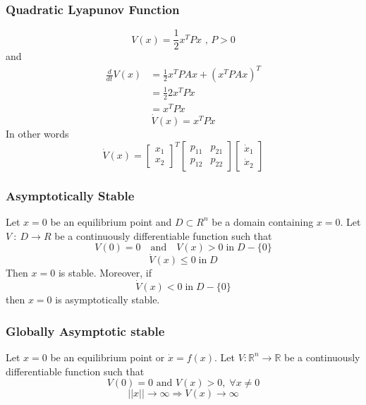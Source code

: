 \documentclass{article}
\begin{document}
\subsubsection{Quadratic Lyapunov Function}
\begin{equation}
	V(x) = \frac{1}{2}x^T Px \textrm{ , } P > 0
\end{equation}
and
\begin{equation}
	\begin{split}
		\frac{d}{dt}V(x) & = \frac{1}{2} x^T P Ax + (x^T PAx)^T \\
		                 & = \frac{1}{2} 2 x^T P\dot x          \\
		                 & = x^T P\dot x
	\end{split}
\end{equation}
\begin{equation}
	\dot V(x) = x^T P\dot x
\end{equation}
In other words
\begin{equation}
	\dot V(x) =
	\begin{bmatrix}
		x_1 \\
		x_2
	\end{bmatrix}^T
	\begin{bmatrix}
		p_{11} & p_{21} \\
		p_{12} & p_{22}
	\end{bmatrix}
	\begin{bmatrix}
		\dot x_1 \\
		\dot x_2
	\end{bmatrix}
\end{equation}
\subsubsection{Asymptotically Stable}
Let $x = 0$ be an equilibrium point and $D \subset R^n$ be a domain containing
$x = 0$. Let $V\::\:D \rightarrow R$ be a continuously differentiable function
such that
\begin{equation}
	V(0) = 0 \quad \textrm{and} \quad V(x) > 0 \; \textrm{in} \; D - \{0\}
\end{equation}
\begin{equation}
	\dot{V}(x) \leq 0 \; \textrm{in} \; D
\end{equation}
Then $x=0$ is stable. Moreover, if
\begin{equation}
	\dot{V}(x) < 0 \; \textrm{in} \; D - \{0\}
\end{equation}
then $x=0$ is asymptotically stable.
\subsubsection{Globally Asymptotic stable}
Let $x=0$ be an equilibrium point or $\dot x = f(x)$. Let $V : \mathbb{R}^n
	\rightarrow \mathbb{R}$ be a continuously differentiable function such that
\begin{equation*}
	V(0) = 0 \text{  and  } V(x) > 0, \; \forall x \neq 0
\end{equation*}
\begin{equation*}
	||x|| \rightarrow \infty \Rightarrow V(x) \rightarrow \infty
\end{equation*}
\end{document}
